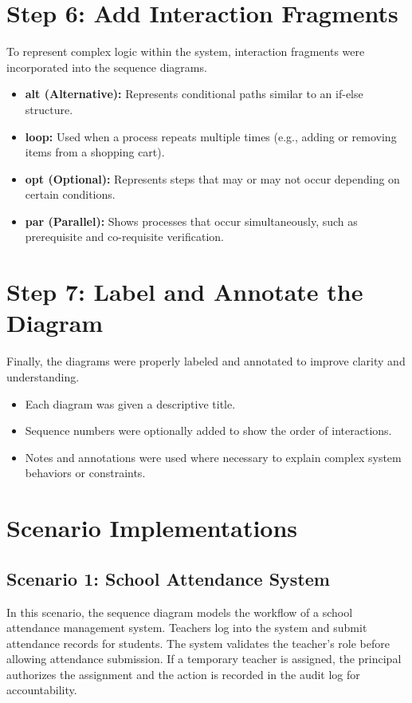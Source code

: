 \section{Step 6: Add Interaction Fragments}
To represent complex logic within the system, interaction fragments were incorporated into the sequence diagrams.

\begin{itemize}
    \item \textbf{alt (Alternative):} Represents conditional paths similar to an if-else structure.
    \item \textbf{loop:} Used when a process repeats multiple times (e.g., adding or removing items from a shopping cart).
    \item \textbf{opt (Optional):} Represents steps that may or may not occur depending on certain conditions.
    \item \textbf{par (Parallel):} Shows processes that occur simultaneously, such as prerequisite and co-requisite verification.
\end{itemize}

\section{Step 7: Label and Annotate the Diagram}
Finally, the diagrams were properly labeled and annotated to improve clarity and understanding.

\begin{itemize}
    \item Each diagram was given a descriptive title.
    \item Sequence numbers were optionally added to show the order of interactions.
    \item Notes and annotations were used where necessary to explain complex system behaviors or constraints.
\end{itemize}

\section{Scenario Implementations}

\subsection{Scenario 1: School Attendance System}
In this scenario, the sequence diagram models the workflow of a school attendance management system. Teachers log into the system and submit attendance records for students. The system validates the teacher’s role before allowing attendance submission. If a temporary teacher is assigned, the principal authorizes the assignment and the action is recorded in the audit log for accountability.

